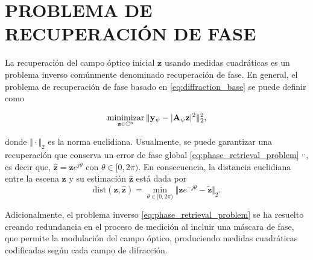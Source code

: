 

\section{PROBLEMA DE RECUPERACIÓN DE FASE}

La recuperación del campo óptico inicial $\mathbf{z}$ usando medidas cuadráticas es un problema inverso comúnmente denominado recuperación de fase. En general, el problema de recuperación de fase basado en \eqref{eq:diffraction_base} se puede definir como 

\begin{equation}
    \operatorname*{minimizar}_{\mathbf{z}\in\mathbb{C}^n}\Vert\mathbf{y}_{\psi} - \vert \mathbf{A}_{\psi}\mathbf{z} \vert^2\Vert_2^2, 
    \label{eq:phase_retrieval_problem}
\end{equation}

donde $\Vert \cdot\Vert_2$ es la norma euclidiana. Usualmente, se puede garantizar una recuperación que conserva un error de fase global \eqref{eq:phase_retrieval_problem} $^,$$^,$, es decir que, $\hat{\mathbf{z}} = \hat{\mathbf{z}}e^{j\theta}$ con $\theta \in [0, 2\pi)$. En consecuencia, la distancia euclidiana entre la escena $\mathbf{z}$ y su estimación $\hat{\mathbf{z}}$ está dada por
\begin{equation}
    \mathrm{dist}(\mathbf{z}, \hat{\mathbf{z}}) = \min_{\theta \in [0, 2\pi)}\Vert \mathbf{z}e^{-j\theta} - \tilde{\mathbf{z}}\Vert_2.
\end{equation}

Adicionalmente, el problema inverso \eqref{eq:phase_retrieval_problem} se ha resuelto creando redundancia en el proceso de medición al incluir una máscara de fase, que permite la modulación del campo óptico, produciendo medidas cuadráticas codificadas según cada campo de difracción.


